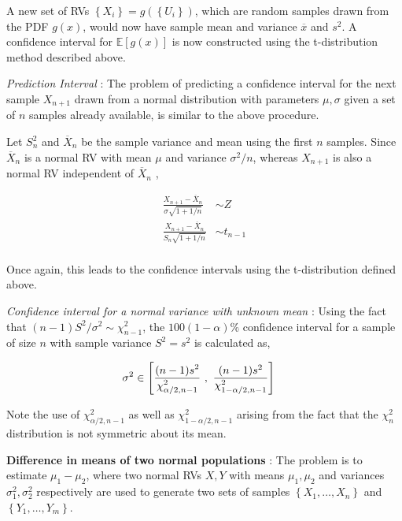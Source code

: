 A new set of RVs $ \left\{X_i\right\}  = g(\left\{U_i\right\})$, which are random samples drawn from the PDF $ g(x) $, would now have sample mean and variance $ \overline{x} $ and $ s^2 $. A confidence interval for $ \mathbb{E}[g(x)] $ is now constructed using the t-distribution method described above. 

\textit{Prediction Interval} : The problem of predicting a confidence interval for the next sample $ X_{n+1} $ drawn from a normal distribution with parameters $ \mu, \sigma $ given a set of $ n $ samples already available, is similar to the above procedure.

Let $ S_n^2 $ and $ \overline{X}_n $ be the sample variance and mean using the first $ n $ samples. Since $ \overline{X}_n $ is a normal RV with mean $ \mu $ and variance $ \sigma^2 / n $, whereas $ X_{n+1} $ is also a normal RV independent of $ \overline{X}_n $ ,


\begin{align}
	\frac{X_{n+1} - \overline{X}_n}{\sigma \sqrt{1 + 1/n}} &\sim Z \nonumber \\
	\frac{X_{n+1} - \overline{X}_n}{S_n \sqrt{1 + 1/n}} &\sim t_{n-1} \nonumber \\
\end{align}

Once again, this leads to the confidence intervals using the t-distribution defined above.

\textit{Confidence interval for a normal variance with unknown mean} : Using the fact that $ (n-1) S^2 / \sigma^2 \sim \chi^2_{n-1} $, the $ 100(1-\alpha) \% $ confidence interval for a sample of size $ n $ with sample variance $ S^2 = s^2 $ is calculated as,

\begin{align}
	\sigma^2 &\in \left[\ddfrac{(n-1)s^2}{\chi^2_{\alpha/2, n-1}}\ ,\ \frac{(n-1)s^2}{\chi^2_{1 - \alpha/2, n-1}}\right]
\end{align}

Note the use of $ \chi^2_{\alpha/2, n-1} $ as well as $ \chi^2_{1 - \alpha/2, n-1} $ arising from the fact that the $ \chi_n^2 $ distribution is not symmetric about its mean.

\textbf{Difference in means of two normal populations} : The problem is to estimate $ \mu_1 - \mu_2 $, where two normal RVs $ X, Y $ with means $ \mu_1, \mu_2 $ and variances $ \sigma_1^2, \sigma_2^2 $ respectively are used to generate two sets of samples $ \left\{X_1, \dots, X_n\right\} $ and $ \left\{Y_1, \dots, Y_m\right\} $.

